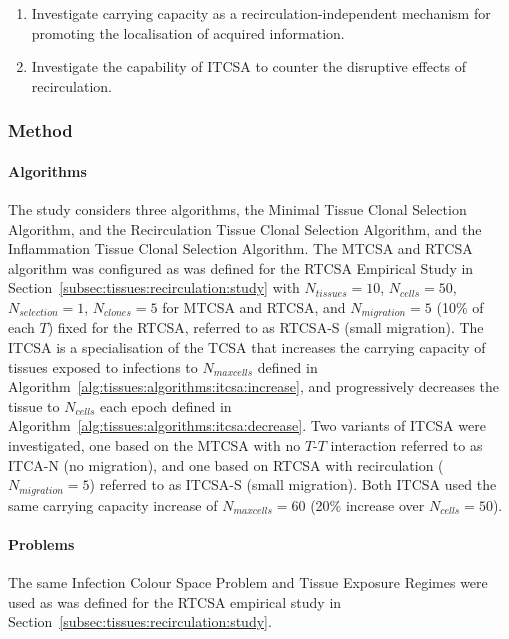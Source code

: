 \begin{enumerate}
	\item Investigate carrying capacity as a recirculation-independent mechanism for promoting the localisation of acquired information.	
	\item Investigate the capability of ITCSA to counter the disruptive effects of recirculation.
\end{enumerate}


%
%
\subsubsection{Method}

%
%
\paragraph{Algorithms}
The study considers three algorithms, the Minimal Tissue Clonal Selection Algorithm, and the Recirculation Tissue Clonal Selection Algorithm, and the Inflammation Tissue Clonal Selection Algorithm. 
The MTCSA and RTCSA algorithm was configured as was defined for the RTCSA Empirical Study in Section~\ref{subsec:tissues:recirculation:study} with $N_{tissues}=10$, $N_{cells}=50$, $N_{selection}=1$, $N_{clones}=5$ for MTCSA and RTCSA, and $N_{migration}=5$ (10\% of each $T$) fixed for the RTCSA, referred to as RTCSA-S (small migration).
The ITCSA is a specialisation of the TCSA that increases the carrying capacity of tissues exposed to infections to $N_{maxcells}$ defined in Algorithm~\ref{alg:tissues:algorithms:itcsa:increase}, and progressively decreases the tissue to $N_{cells}$ each epoch defined in Algorithm~\ref{alg:tissues:algorithms:itcsa:decrease}. Two variants of ITCSA were investigated, one based on the MTCSA with no $T$-$T$ interaction referred to as ITCA-N (no migration), and one based on RTCSA with recirculation ($N_{migration}=5$) referred to as ITCSA-S (small migration). Both ITCSA used the same carrying capacity increase of $N_{maxcells}=60$ (20\% increase over $N_{cells}=50$). 

%
%
\paragraph{Problems}
The same Infection Colour Space Problem and Tissue Exposure Regimes were used as was defined for the RTCSA empirical study in Section~\ref{subsec:tissues:recirculation:study}.

%
%
